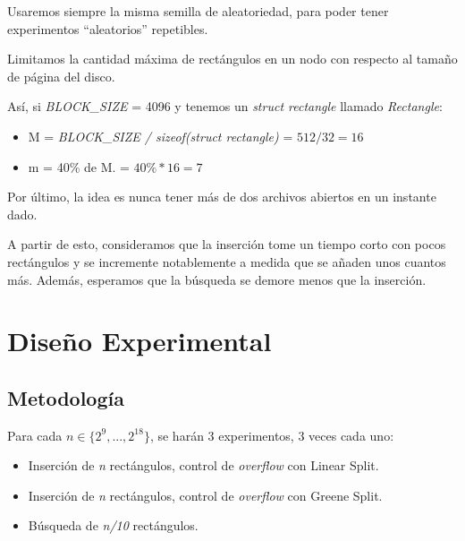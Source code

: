 \documentclass[letterpaper,10pt]{article}
\begin{document}
	Usaremos siempre la misma semilla de aleatoriedad, para poder tener experimentos ``aleatorios'' repetibles.

	Limitamos la cantidad máxima de rectángulos en un nodo con respecto al tamaño de página del disco.

	Así, si \textit{BLOCK\_SIZE} = 4096 y tenemos un \textit{struct rectangle} llamado \textit{Rectangle}:

	\begin{itemize}
		\item M = \textit{BLOCK\_SIZE / sizeof(struct rectangle)} = $ 512 / 32 = 16 $
		\item m = 40\% de M. = $ 40\% * 16 = 7 $
	\end{itemize}

	Por último, la idea es nunca tener más de dos archivos abiertos en un instante dado.

	A partir de esto, consideramos que la inserción tome un tiempo corto con pocos rectángulos y se incremente notablemente a medida que se añaden unos cuantos más.
	Además, esperamos que la búsqueda se demore menos que la inserción.

	\newpage

	\section{Diseño Experimental}

	\subsection{Metodología}

	Para cada $n \in \{2^{9}, ..., 2^{18}\}$, se harán 3 experimentos, 3 veces cada uno:

	\begin{itemize}
		\item Inserción de \textit{n} rectángulos, control de \textit{overflow} con Linear Split.
		\item Inserción de \textit{n} rectángulos, control de \textit{overflow} con Greene Split.
		\item Búsqueda de \textit{n/10} rectángulos.
	\end{itemize}
\end{document}
